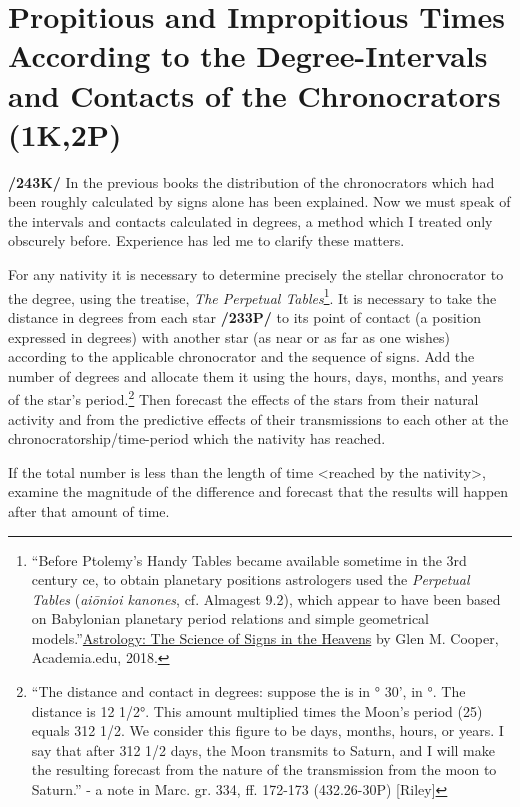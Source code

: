 \section{Propitious and Impropitious Times According to the Degree-Intervals and Contacts of the Chronocrators (1K,2P)}

\textbf{/243K/} In the previous books the distribution of the chronocrators which had been roughly calculated by signs alone has been explained. Now we must speak of the intervals and contacts calculated in degrees, a method which I treated only obscurely before. Experience has led me to clarify these matters.

For any nativity it is necessary to determine precisely the stellar chronocrator to the degree, using the treatise, \textsl{The Perpetual Tables}\footnote{``Before Ptolemy’s Handy Tables became available sometime in the 3rd century ce, to obtain planetary positions astrologers used the \textsl{Perpetual Tables} (\textsl{aiōnioi kanones}, cf. Almagest 9.2), which appear to have been based on Babylonian planetary period relations and simple geometrical models.''\href{https://www.academia.edu/31038622/_Astrology_The_Science_of_Signs_in_the_Heavens_In_The_Oxford_Handbook_to_Science_and_Medicine_in_the_Classical_World_edited_by_P_T_Keyser_and_J_Scarborough_Oxford_PROOFS_2018_} {Astrology: The Science of Signs in the Heavens} by Glen M. Cooper, Academia.edu, 2018.}. It is necessary to take the distance in degrees from each star \textbf{/233P/} to its point of contact (a position expressed in degrees) with another star (as near or as far as one wishes) according to the applicable chronocrator and the sequence of signs. Add the number of degrees and allocate them it using the hours, days, months, and years of the star’s period.\footnote{“The distance and contact in degrees: suppose the \Moon\xspace is in \Virgo\xspace 21° 30', \Saturn\xspace in °. The distance is 12 1/2°. This amount multiplied times the Moon’s period (25) equals 312 1/2. We consider this figure to be days, months, hours, or years. I say that after 312 1/2 days, the Moon transmits to Saturn, and I will make the resulting forecast from the nature of the transmission from the moon to Saturn.” - a note in Marc. gr. 334, ff. 172-173 (432.26-30P) [Riley]} Then forecast the effects of the stars from their natural activity and from the predictive effects of their transmissions to each other at the chronocratorship/time-period which the nativity has reached. 

If the total number is less than the length of time <reached by the nativity>, examine the magnitude of the difference and forecast that the results will happen after that amount of time. 

